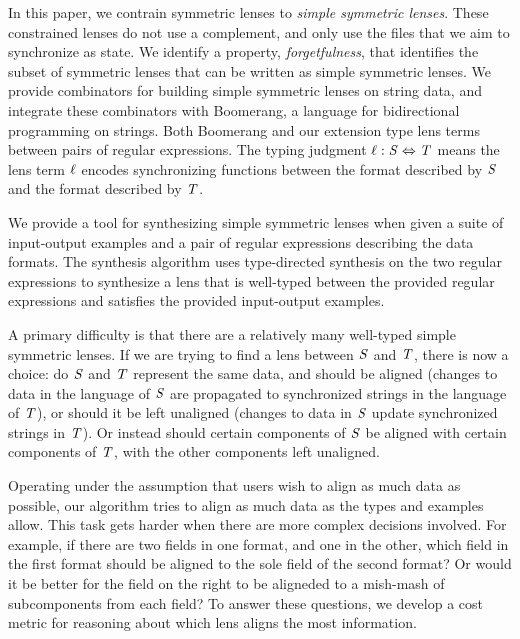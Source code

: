 \documentclass[acmsmall,screen,anonymous]{acmart}
\begin{document}
In this paper, we contrain symmetric lenses to \emph{simple symmetric lenses}.
These constrained lenses do not use a complement, and only use the files that we
aim to synchronize as state. We identify a property, \emph{forgetfulness}, that
identifies the subset of symmetric lenses that can be written as simple
symmetric lenses. We provide combinators for building simple symmetric lenses on
string data, and integrate these combinators with Boomerang, a language for
bidirectional programming on strings. Both Boomerang and our extension type lens
terms between pairs of regular expressions. The typing judgment $\mathit{\ell} : \mathit{S}
\Leftrightarrow \mathit{T}$ means the lens term $\mathit{\ell}$ encodes synchronizing
functions between the format described by $\mathit{S}$ and the format described by
$\mathit{T}$.

We provide a tool for synthesizing simple symmetric lenses when given a suite of
input-output examples and a pair of regular expressions describing the data
formats. The synthesis algorithm uses type-directed synthesis
on the two regular expressions to synthesize a lens that is well-typed between
the provided regular expressions and satisfies the provided input-output
examples.

 A primary difficulty is
that there are a relatively many well-typed simple symmetric lenses. If we are
trying to find a lens between $\mathit{S}$ and $\mathit{T}$, there is now a choice:
do $\mathit{S}$ and $\mathit{T}$ represent the same data, and should be aligned
(changes to data in the language of $\mathit{S}$ are propagated to synchronized
strings in the language of $\mathit{T}$), or should it be left unaligned (changes
to data in $\mathit{S}$ update synchronized strings in $\mathit{T}$). Or instead
should certain components of $\mathit{S}$ be aligned with certain components of
$\mathit{T}$, with the other components left unaligned.

Operating under the assumption that users wish to align as much data as
possible, our algorithm tries to align as much data as the types and examples
allow. This task gets harder when there are more complex decisions involved. For
example, if there are two fields in one format, and one in the other, which field
in the first format should be aligned to the sole field of the second format? Or
would it be better for the field on the right to be aligneded to a mish-mash
of subcomponents from each field? To answer these questions, we develop a cost
metric for reasoning about which lens aligns the most information.
\end{document}
